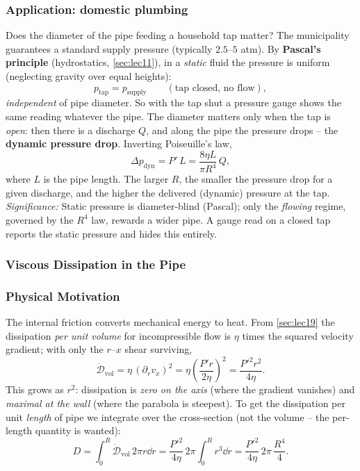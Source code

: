 \documentclass[../main.tex]{subfiles}
\begin{document}
\subsubsection*{Application: domestic plumbing}\label{sec:lec20:plumbing}
Does the diameter of the pipe feeding a household tap matter? The municipality guarantees a standard supply pressure (typically $2.5$--$5$ atm). By \textbf{Pascal's principle} (hydrostatics, \cref{sec:lec11}), in a \emph{static} fluid the pressure is uniform (neglecting gravity over equal heights):
\begin{equation}
  p_{\text{tap}}=p_{\text{supply}}\qquad(\text{tap closed, no flow}),
  \label{eq:lec20_pascal}
\end{equation}
\emph{independent} of pipe diameter. So with the tap shut a pressure gauge shows the same reading whatever the pipe. The diameter matters only when the tap is \emph{open}: then there is a discharge $Q$, and along the pipe the pressure drops -- the \textbf{dynamic pressure drop}. Inverting Poiseuille's law,
\begin{equation}
  \Delta p_{\text{dyn}}=P'\,L=\frac{8\eta L}{\pi R^4}\,Q ,
  \label{eq:lec20_pdyn}
\end{equation}
where $L$ is the pipe length. The larger $R$, the smaller the pressure drop for a given discharge, and the higher the delivered (dynamic) pressure at the tap.
\textit{Significance:} Static pressure is diameter-blind (Pascal); only the \emph{flowing} regime, governed by the $R^4$ law, rewards a wider pipe. A gauge read on a closed tap reports the static pressure and hides this entirely.

\subsubsection{Viscous Dissipation in the Pipe}\label{sec:lec20:dissipation}

\subsubsection*{Physical Motivation}
The internal friction converts mechanical energy to heat. From \cref{sec:lec19} the dissipation \emph{per unit volume} for incompressible flow is $\eta$ times the squared velocity gradient; with only the $r$--$x$ shear surviving,
\begin{equation}
  \dot{\mathcal D}_{\text{vol}}=\eta\,(\partial_r v_x)^2
   =\eta\left(\frac{P'r}{2\eta}\right)^2=\frac{P'^2 r^2}{4\eta}.
  \label{eq:lec20_diss_vol}
\end{equation}
This grows as $r^2$: dissipation is \emph{zero on the axis} (where the gradient vanishes) and \emph{maximal at the wall} (where the parabola is steepest). To get the dissipation per unit \emph{length} of pipe we integrate over the cross-section (not the volume -- the per-length quantity is wanted):
\begin{equation}
  D=\int_0^R \dot{\mathcal D}_{\text{vol}}\,2\pi r\dd{r}
   =\frac{P'^2}{4\eta}\,2\pi\int_0^R r^3\dd{r}
   =\frac{P'^2}{4\eta}\,2\pi\,\frac{R^4}{4}.
  \label{eq:lec20_diss_int}
\end{equation}
\end{document}
